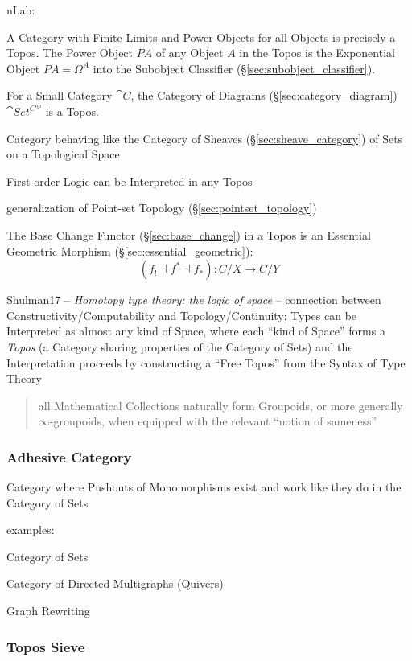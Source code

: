 nLab:

A Category with Finite Limits and Power Objects for all Objects is
precisely a Topos. The Power Object $P A$ of any Object $A$ in the
Topos is the Exponential Object $P A = \Omega^A$ into the Subobject
Classifier (\S\ref{sec:subobject_classifier}).

For a Small Category $\cat{C}$, the Category of Diagrams
(\S\ref{sec:category_diagram}) $\cat{Set^{C^{op}}}$ is a
Topos.\cite{awodey06}

Category behaving like the Category of Sheaves
(\S\ref{sec:sheave_category}) of Sets on a Topological Space

First-order Logic can be Interpreted in any Topos

generalization of Point-set Topology (\S\ref{sec:pointset_topology})

The Base Change Functor (\S\ref{sec:base_change}) in a Topos is an
Essential Geometric Morphism (\S\ref{sec:essential_geometric}):
\[
  (f_! \dashv f^* \dashv f_*):C/X \rightarrow C/Y
\]


Shulman17 -- \emph{Homotopy type theory: the logic of space} --
connection between Constructivity/Computability and Topology/Continuity; Types
can be Interpreted as almost any kind of Space, where each ``kind of Space''
forms a \emph{Topos} (a Category sharing properties of the Category of Sets) and
the Interpretation proceeds by constructing a ``Free Topos'' from the Syntax of
Type Theory
\begin{quote}
all Mathematical Collections naturally form Groupoids, or more
generally $\infty$-groupoids, when equipped with the relevant ``notion
of sameness''
\end{quote}



\subsubsection{Adhesive Category}\label{sec:adhesive_category}

Category where Pushouts of Monomorphisms exist and work like they do in the
Category of Sets

examples:

Category of Sets

Category of Directed Multigraphs (Quivers)

Graph Rewriting %



\subsubsection{Topos Sieve}\label{sec:topos_sieve}

